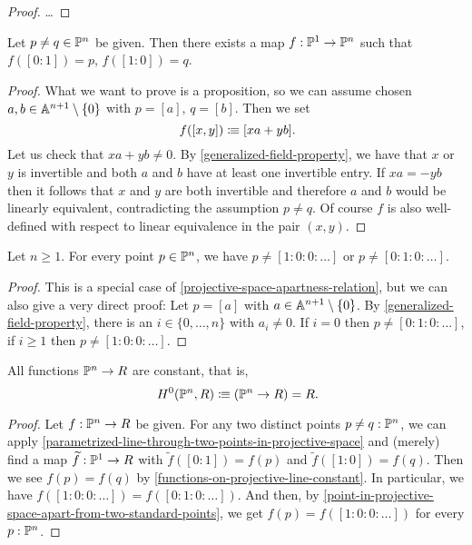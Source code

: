 \begin{proof}
  \dots
\end{proof}

\begin{lemma}%
  \label{parametrized-line-through-two-points-in-projective-space}
  Let $p \neq q \in \mathbb{P}^n$ be given.
  Then there exists a map $f : \mathbb{P}^1 \to \mathbb{P}^n$
  such that $f([0 : 1]) = p$, $f([1 : 0]) = q$.
\end{lemma}

\begin{proof}
  What we want to prove is a proposition,
  so we can assume chosen $a, b \in \mathbb{A}^{n+1} \setminus \{0\}$
  with $p = [a]$, $q = [b]$.
  Then we set
  \[ f([x, y]) \colonequiv [xa + yb] \rlap{.}\]
  Let us check that $xa + yb \neq 0$.
  By \cref{generalized-field-property},
  we have that $x$ or $y$ is invertible
  and both $a$ and $b$ have at least one invertible entry.
  If $xa = - yb$
  then it follows that $x$ and $y$ are both invertible
  and therefore $a$ and $b$ would be linearly equivalent,
  contradicting the assumption $p \neq q$.
  Of course $f$ is also well-defined
  with respect to linear equivalence in the pair $(x, y)$.
\end{proof}

\begin{lemma}%
  \label{point-in-projective-space-apart-from-two-standard-points}
  Let $n \geq 1$.
  For every point $p \in \mathbb{P}^n$,
  we have $p \neq [1 : 0 : 0 : \dots]$
  or $p \neq [0 : 1 : 0 : \dots]$.
\end{lemma}

\begin{proof}
  This is a special case of \cref{projective-space-apartness-relation},
  but we can also give a very direct proof:
  Let $p = [a]$ with $a \in \mathbb{A}^{n+1} \setminus \{0\}$.
  By \cref{generalized-field-property},
  there is an $i \in \{0, \dots, n\}$ with $a_i \neq 0$.
  If $i = 0$ then $p \neq [0 : 1 : 0 : \dots]$,
  if $i \geq 1$ then $p \neq [1 : 0 : 0 : \dots]$.
\end{proof}

\begin{theorem}%
  \label{functions-on-projective-space-constant}
  All functions $\mathbb{P}^n \to R$ are constant,
  that is,
  \[ H^0(\bP^n, R) \colonequiv (\bP^n \to R) = R \rlap{.} \]
\end{theorem}

\begin{proof}
  Let $f : \mathbb{P}^n \to R$ be given.
  For any two distinct points $p \neq q : \mathbb{P}^n$,
  we can apply \cref{parametrized-line-through-two-points-in-projective-space}
  and (merely) find a map $\widetilde{f} : \mathbb{P}^1 \to R$
  with $\widetilde{f}([0 : 1]) = f(p)$
  and $\widetilde{f}([1 : 0]) = f(q)$.
  Then we see $f(p) = f(q)$
  by \cref{functions-on-projective-line-constant}.
  In particular, we have $f([1 : 0 : 0 : \dots]) = f([0 : 1 : 0 : \dots])$.
  And then, by \cref{point-in-projective-space-apart-from-two-standard-points},
  we get $f(p) = f([1 : 0 : 0 : \dots])$ for every $p : \mathbb{P}^n$.
\end{proof}
